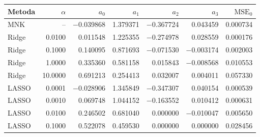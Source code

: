 \begin{tabular}{lrrrrrr}
\toprule
Metoda & $\alpha$ & $a_0$ & $a_1$ & $a_2$ & $a_3$ & $\mathrm{MSE}_0$ \\
\midrule
MNK & -- & \num{-0.039868} & \num{1.379371} & \num{-0.367724} & \num{0.043459} & \num{0.000734} \\
Ridge & \num{0.0100} & \num{0.011548} & \num{1.225355} & \num{-0.274978} & \num{0.028559} & \num{0.000176} \\
Ridge & \num{0.1000} & \num{0.140095} & \num{0.871693} & \num{-0.071530} & \num{-0.003174} & \num{0.002003} \\
Ridge & \num{1.0000} & \num{0.335360} & \num{0.581158} & \num{0.015843} & \num{-0.008568} & \num{0.010553} \\
Ridge & \num{10.0000} & \num{0.691213} & \num{0.254413} & \num{0.032007} & \num{0.004011} & \num{0.057330} \\
LASSO & \num{0.0001} & \num{-0.028906} & \num{1.345849} & \num{-0.347307} & \num{0.040154} & \num{0.000539} \\
LASSO & \num{0.0010} & \num{0.069748} & \num{1.044152} & \num{-0.163552} & \num{0.010412} & \num{0.000631} \\
LASSO & \num{0.0100} & \num{0.246502} & \num{0.681040} & \num{0.000000} & \num{-0.010047} & \num{0.005650} \\
LASSO & \num{0.1000} & \num{0.522078} & \num{0.459530} & \num{0.000000} & \num{0.000000} & \num{0.028456} \\
\bottomrule
\end{tabular}
